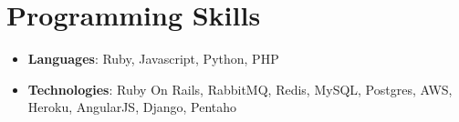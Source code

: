 \documentclass[letterpaper,11pt]{article}
\newcommand{\resumeSubHeadingListStart}{\begin{itemize}[leftmargin=*]}
\newcommand{\resumeSubHeadingListEnd}{\end{itemize}}
\begin{document}
%
\section{Programming Skills}
\resumeSubHeadingListStart
\item{
\textbf{Languages}{: Ruby, Javascript, Python, PHP}}
\item{
\textbf{Technologies}{: Ruby On Rails, RabbitMQ, Redis, MySQL, Postgres, AWS, Heroku, AngularJS, Django, Pentaho}}
\resumeSubHeadingListEnd


\end{document}
